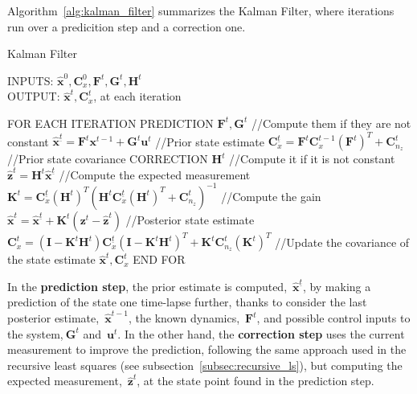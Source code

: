 Algorithm~\ref{alg:kalman_filter} summarizes the Kalman Filter, where iterations run over a predicition step and a correction one. 
\begin{algorithm}
\caption{Kalman Filter}
INPUTS: $\hat{\mathbf{x}}^0,\mathbf{C}^0_x,\mathbf{F}^t,\mathbf{G}^t,\mathbf{H}^t$\\
OUTPUT: $\hat{\mathbf{x}}^t,\mathbf{C}^t_x$, at each iteration
\begin{algorithmic}
\STATE FOR EACH ITERATION
\STATE \hspace{0.5cm} PREDICTION
\STATE \hspace{1cm} $\mathbf{F}^t,\mathbf{G}^t$ //Compute them if they are not constant
\STATE \hspace{1cm} $\hat{\mathbf{x}}^{\underline{t}} = \mathbf{F}^t\mathbf{x}^{t-1} + \mathbf{G}^t\mathbf{u}^{t}$ //Prior state estimate
\STATE \hspace{1cm} $\mathbf{C}^{\underline{t}}_x = \mathbf{F}^t\mathbf{C}^{t-1}_x(\mathbf{F}^t)^T + \mathbf{C}^t_{n_z}$ //Prior state covariance
\STATE \hspace{0.5cm} CORRECTION
\STATE \hspace{1cm} $\mathbf{H}^t$ //Compute it if it is not constant
\STATE \hspace{1cm} $\hat{\mathbf{z}}^t = \mathbf{H}^t\hat{\mathbf{x}}^{\underline{t}}$ //Compute the expected measurement 
\STATE \hspace{1cm} $\mathbf{K}^t = \mathbf{C}^{\underline{t}}_x(\mathbf{H}^t)^T(\mathbf{H}^t\mathbf{C}^{\underline{t}}_x(\mathbf{H}^t)^T+\mathbf{C}^t_{n_z})^{-1}$ 
//Compute the gain
\STATE \hspace{1cm} $\hat{\mathbf{x}}^t = \hat{\mathbf{x}}^{\underline{t}} + \mathbf{K}^t(\mathbf{z}^t - \hat{\mathbf{z}}^t)$ //Posterior state estimate
\STATE \hspace{1cm} $\mathbf{C}^t_{x} = (\mathbf{I}-\mathbf{K}^t\mathbf{H}^t)\mathbf{C}^{\underline{t}}_x(\mathbf{I}-\mathbf{K}^t\mathbf{H}^t)^T
		    + \mathbf{K}^t\mathbf{C}^t_{n_z}(\mathbf{K}^t)^T$ //Update the covariance of the state estimate
\RETURN $\hat{\mathbf{x}}^t,\mathbf{C}^t_x$		    
\STATE END FOR
\end{algorithmic}
\label{alg:kalman_filter}
\end{algorithm}

In the \textbf{prediction step}, the prior estimate is computed,~$\hat{\mathbf{x}}^{\underline{t}}$, by making a prediction of the state one time-lapse further, thanks to consider the last posterior estimate,~$\hat{\mathbf{x}}^{t-1}$, the known dynamics,~$\mathbf{F}^t$, and possible control inputs to the system,$~\mathbf{G}^t$ and~$\mathbf{u}^t$. In the other hand, the \textbf{correction step} uses the current measurement to improve the prediction, following the same approach used in the recursive least squares (see subsection~\ref{subsec:recursive_ls}), but computing the expected measurement,~$\hat{\mathbf{z}}^t$, at the state point found in the prediction step. 

